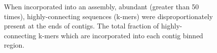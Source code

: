 \documentclass[10pt]{article}
\begin{document}
\begin{figure}
\caption{When incorporated into an assembly, abundant (greater than 50 times), highly-connecting sequences (k-mers) were disproportionately present at the ends of contigs.  The total fraction of highly-connecting k-mers which are incorporated into each contig binned region.}
\end{figure}
\end{document}

